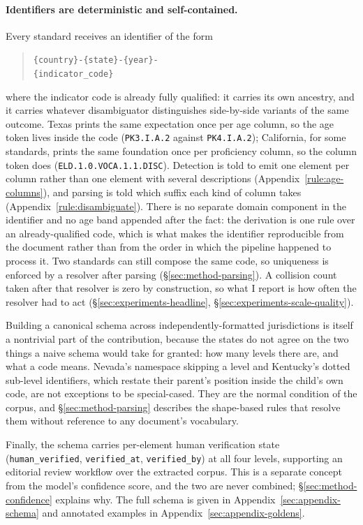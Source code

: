 \paragraph{Identifiers are deterministic and self-contained.} Every standard
receives an identifier of the form
\begin{quote}
\texttt{\{country\}-\{state\}-\{year\}-}\\
\texttt{\{indicator\_code\}}
\end{quote}
\noindent where the indicator
code is already fully qualified: it carries its own ancestry, and it carries
whatever disambiguator distinguishes side-by-side variants of the same outcome.
Texas prints the same expectation once per age column, so the age token lives
inside the code (\texttt{PK3.I.A.2} against \texttt{PK4.I.A.2}); California, for some standards,
prints the same foundation once per proficiency column, so the column token does
(\texttt{ELD.1.0.VOCA.1.1.DISC}). Detection is told to emit one element per
column rather than one element with several descriptions
(Appendix~\ref{rule:age-columns}), and parsing is told which suffix each kind of
column takes (Appendix~\ref{rule:disambiguate}). There is no separate domain component in the
identifier and no age band appended after the fact: the derivation is one rule
over an already-qualified code, which is what makes the identifier reproducible
from the document rather than from the order in which the pipeline happened to
process it. Two standards can still compose the same code, so uniqueness is
enforced by a resolver after parsing (\S\ref{sec:method-parsing}). A collision
count taken after that resolver is zero by construction, so what I report is
how often the resolver had to act (\S\ref{sec:experiments-headline},
\S\ref{sec:experiments-scale-quality}).

Building a canonical schema across independently-formatted jurisdictions is
itself a nontrivial part of the contribution, because the states do not agree on
the two things a naive schema would take for granted: how many levels there are,
and what a code means. Nevada's namespace skipping a level and Kentucky's
dotted sub-level identifiers, which restate their parent's position inside the
child's own code, are not exceptions to be special-cased. They are the normal
condition of the corpus, and \S\ref{sec:method-parsing} describes the
shape-based rules that resolve them without reference to any document's
vocabulary.

Finally, the schema carries per-element human verification state
(\texttt{human\_verified}, \texttt{verified\_at}, \texttt{verified\_by}) at all
four levels, supporting an editorial review workflow over the extracted corpus.
This is a separate concept from the model's confidence score, and the two are
never combined; \S\ref{sec:method-confidence} explains why. The full schema is
given in Appendix~\ref{sec:appendix-schema} and annotated examples in
Appendix~\ref{sec:appendix-goldens}.
